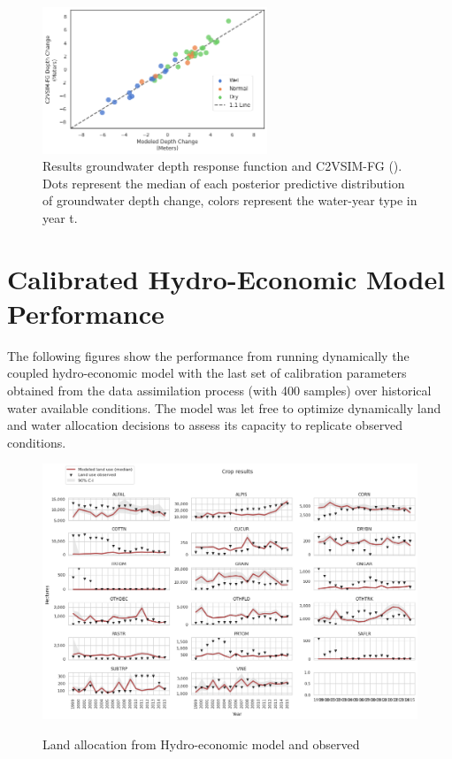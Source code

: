\documentclass[11pt,a4paper]{article}
\begin{document}
\begin{figure}[H]
    \centering
    \includegraphics[width=0.6\textwidth]{results_gw_depth_response_calib.png}
    \caption{Results groundwater depth response function and C2VSIM-FG (\cite{dwr_c2vsimfg_2021}). Dots represent the median of each posterior predictive distribution of groundwater depth change, colors represent the water-year type in year t.}
    \label{fig:mesh1}
\end{figure}

\section{Calibrated Hydro-Economic Model Performance}

The following figures show the performance from running dynamically the coupled hydro-economic model with the last set of calibration parameters obtained from the data assimilation process (with 400 samples) over historical water available conditions. The model was let free to optimize dynamically land and water allocation decisions to assess its capacity to replicate observed conditions. 

\begin{figure}[H]
\centering
\includegraphics[width=1\textwidth]{./figs/land_use.png}
\label{fig:mesh1}
\caption{Land allocation from Hydro-economic model and observed}
\end{figure}
\end{document}
